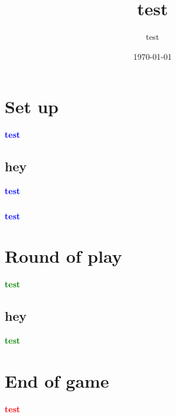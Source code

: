 \documentclass{article}%
\title{test}%
\author{test}%
\date{\today}%
\begin{document}
%
\normalsize%
\maketitle\thispagestyle{header}%
\pagestyle{header}%
\section{ Set up
}%
\label{sec:Setup}%
\textcolor{blue}{%
\textbf{test}%
}%



%
\subsection{ hey
}%
\label{subsec:hey}%
\textcolor{blue}{%
\textbf{test}%
}%



%
\subsubsection{
}%
\label{ssubsec:}%
\textcolor{blue}{%
\textbf{test}%
}%



%
\section{ Round of play
}%
\label{sec:Roundofplay}%
\textcolor{green}{%
\textbf{test}%
}%



%
\subsection{ hey
}%
\label{subsec:hey}%
\textcolor{green}{%
\textbf{test}%
}%



%
\section{ End of game
}%
\label{sec:Endofgame}%
\textcolor{red}{%
\textbf{test}%
}

%
\end{document}
